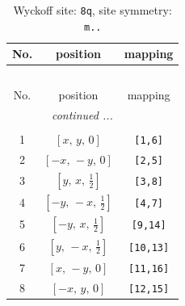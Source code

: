 \documentclass[fleqn,8pt]{jsarticle}
\begin{document}
\begin{longtable}{ccc}
\caption{Wyckoff site: {\tt 8q}, site symmetry: {\tt m..}}
 \\
 \hline \hline
No. & position & mapping \\ \hline \endfirsthead

\multicolumn{2}{l}{\tablename\ \thetable{}} \\
 \hline \hline
No. & position & mapping \\ \hline \endhead

 \hline \hline
\multicolumn{2}{r}{\footnotesize\it continued ...} \\ \endfoot

 \hline \hline
\multicolumn{2}{r}{} \\ \endlastfoot

1 & $\left[ x,\, y,\, 0 \right]$ & {\tt [1,6]} \\ \hline
2 & $\left[ - x,\, - y,\, 0 \right]$ & {\tt [2,5]} \\ \hline
3 & $\left[ y,\, x,\, \frac{1}{2} \right]$ & {\tt [3,8]} \\ \hline
4 & $\left[ - y,\, - x,\, \frac{1}{2} \right]$ & {\tt [4,7]} \\ \hline
5 & $\left[ - y,\, x,\, \frac{1}{2} \right]$ & {\tt [9,14]} \\ \hline
6 & $\left[ y,\, - x,\, \frac{1}{2} \right]$ & {\tt [10,13]} \\ \hline
7 & $\left[ x,\, - y,\, 0 \right]$ & {\tt [11,16]} \\ \hline
8 & $\left[ - x,\, y,\, 0 \right]$ & {\tt [12,15]} \\
\end{longtable}
\renewcommand{\arraystretch}{1.2}
\end{document}
